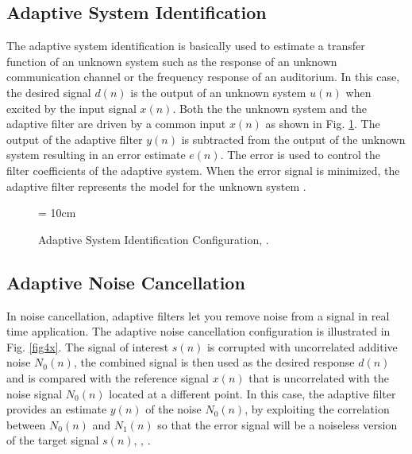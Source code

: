 \subsection{Adaptive System Identification}\label{sec:1.3.1}
\vspace{-0.5cm}
\noindent  The adaptive system identification is basically used to estimate a transfer function of an unknown system such as the response of an unknown communication channel or the frequency response of an auditorium. In this case, the desired signal $d(n)$ is the output of an unknown system $u(n)$ when excited by the input signal $x(n)$. Both the the unknown system and the adaptive filter are driven by a common input $x(n)$ as shown in Fig. \ref{fig3x}. The output of the adaptive filter $y(n)$ is subtracted from the output of the unknown system resulting in an error estimate $e(n)$. The error is used to control the filter coefficients of the adaptive system. When the error signal is minimized, the adaptive filter represents the model for the unknown system \cite{Mathews}.

\begin{figure}[h]
\begin{center}
\vspace{1cm}
\epsfxsize = 10cm
\end{center}
\vspace{-1cm}
\caption{Adaptive System Identification Configuration, \cite{shukur}.}
\label{fig3x}
\vspace{1.5cm}
\end{figure}

\vspace{-0.3cm}
\subsection{Adaptive Noise Cancellation}\label{sec:1.3.2}
\vspace{-0.5cm}
\noindent In noise cancellation, adaptive filters let you remove noise from a signal in real time application. The adaptive noise cancellation configuration is illustrated in Fig. \ref{fig4x}. The signal of interest $s(n)$ is corrupted with uncorrelated additive noise $N_0(n)$, the combined signal is then used as the desired response $d(n)$  and is compared with the reference signal $x(n)$ that is uncorrelated with the noise signal $N_0(n)$ located at a different point. In this case, the adaptive filter provides an estimate $y(n)$ of the noise  $N_0(n)$, by exploiting the correlation between  $N_0(n)$ and  $N_1(n)$ so that the error signal will be a noiseless version of the target signal $s(n)$, \cite{shukur}, \cite{Glover}.

